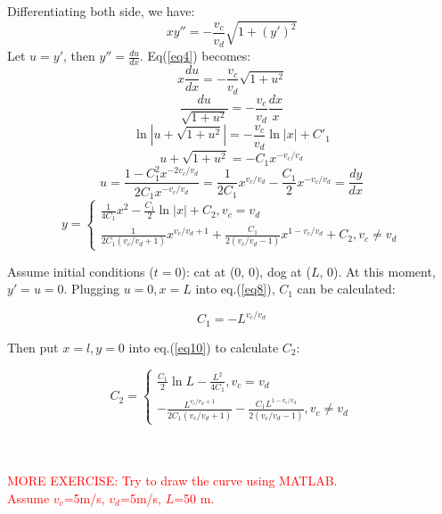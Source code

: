 \documentclass[a4paper,11pt]{article}
\begin{document}
Differentiating both side, we have:
\begin{equation}\label{eq4}
    xy'' = -\frac{v_c}{v_d} \sqrt{1+(y')^2}
\end{equation}
Let $u=y'$, then $y''=\displaystyle{\frac{du}{dx}}$.
Eq(\ref{eq4}) becomes:
\begin{equation}\label{eq5}
    x \frac{du}{dx} = -\frac{v_c}{v_d} \sqrt{1+u^2}
\end{equation}
\begin{equation}\label{eq6}
    \frac{du}{\sqrt{1+u^2}} = -\frac{v_c}{v_d} \frac{dx}{x}
\end{equation}
\begin{equation}\label{eq7}
    \ln |u + \sqrt{1+u^2}| = -\frac{v_c}{v_d}\ln|x| + C'_1
\end{equation}
\begin{equation}\label{eq8}
    u + \sqrt{1+u^2} = -C_1 x^{-v_c/v_d}
\end{equation}
\begin{equation}\label{eq9}
    u = \frac{1- C_1^2 x^{-2v_c/v_d}}{2C_1 x^{-v_c/v_d}}
    = \frac{1}{2C_1} x^{v_c/v_d} - \frac{C_1}{2} x^{-v_c/v_d} = \frac{dy}{dx}
\end{equation}
\begin{equation}\label{eq10}
    y = \left\{ \begin{array}{l}
        \displaystyle{\frac{1}{4C_1} x^2 -\frac{C_1}{2}\ln |x|}+C_2,
            v_c=v_d\\
        \displaystyle{\frac{1}{2C_1(v_c/v_d+1)} x^{v_c/v_d+1} +
        \frac{C_1}{2(v_c/v_d-1)}x^{1-v_c/v_d}} +C_2, v_c\ne v_d
    \end{array}
    \right.
\end{equation}


Assume initial conditions ($t=0$): cat at (0, 0), dog at ($L$, 0).
At this moment, $y'=u=0$. Plugging $u=0, x=L$ into eq.(\ref{eq8}),
$C_1$ can be calculated:

\begin{equation}\label{eq11}
    C_1 = -L^{v_c/v_d}
\end{equation}

Then put $x=l, y=0$ into eq.(\ref{eq10}) to calculate $C_2$:

\begin{equation}\label{eq12}
    C_2 = \left\{ \begin{array}{l}
        \displaystyle{\frac{C_1}{2}\ln L - \frac{L^2}{4C_1}}, v_c=v_d\\
        -\displaystyle{\frac{L^{v_c/v_d+1}}{2C_1(v_c/v_d+1)}
        -\frac{C_1 L^{1-v_c/v_d}}{2(v_c/v_d-1)}}, v_c\ne v_d
    \end{array}
    \right.
\end{equation}

\ \\ \ \\

\noindent \textcolor{red}{MORE EXERCISE: Try to draw the curve using MATLAB.
\ \\
Assume $v_c$=5m/s, $v_d$=5m/s, $L$=50 m.}
\end{document}
